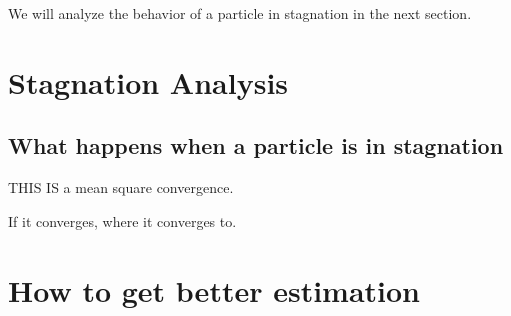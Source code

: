 \documentclass[12pt]{article}
\begin{document}
We will analyze the behavior of a particle in stagnation in the next section.

\section{Stagnation Analysis}

\subsection{What happens when a particle is in stagnation}

THIS IS a mean square convergence.


If it converges, where it converges to.

\section{How to get better estimation}






\end{document}
